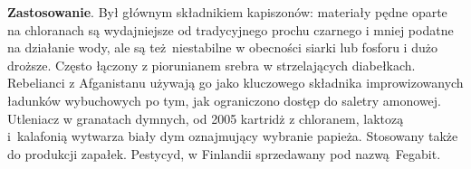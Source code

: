 \textbf{Zastosowanie}.
Był głównym składnikiem kapiszonów: materiały pędne oparte na chloranach są wydajniejsze od tradycyjnego prochu czarnego i mniej podatne na działanie wody, ale są też niestabilne w obecności siarki lub fosforu i dużo droższe.
Często łączony z piorunianem srebra w strzelających diabełkach.
Rebelianci z Afganistanu używają go jako kluczowego składnika improwizowanych ładunków wybuchowych po tym, jak ograniczono dostęp do saletry amonowej.
Utleniacz w granatach dymnych, od 2005 kartridż z chloranem, laktozą i~kalafonią wytwarza biały dym oznajmujący wybranie papieża.
Stosowany także do produkcji zapałek.
Pestycyd, w Finlandii sprzedawany pod nazwą Fegabit.
